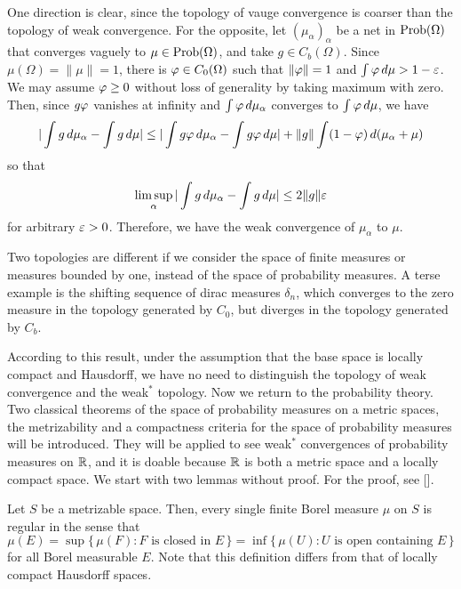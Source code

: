 \documentclass[10pt]{article}
\begin{document}
\begin{pf}
One direction is clear, since the topology of vauge convergence is coarser than the topology of weak convergence.
For the opposite, let $(\mu_\alpha)_\alpha$ be a net in $\operatorname{Prob}(\Omega)$ that converges vaguely to $\mu\in\operatorname{Prob}(\Omega)$, and take $g\in C_b(\Omega)$.
Since $\mu(\Omega)=\|\mu\|=1$, there is $\varphi\in C_0(\Omega)$ such that $\|\varphi\|=1$ and $\int\varphi\,d\mu>1-\varepsilon$.
We may assume $\varphi\ge0$ without loss of generality by taking maximum with zero.
Then, since $g\varphi$ vanishes at infinity and $\int\varphi\,d\mu_\alpha$ converges to $\int\varphi\,d\mu$, we have
\[|\int g\,d\mu_\alpha-\int g\,d\mu|\le|\int g\varphi\,d\mu_\alpha-\int g\varphi\,d\mu|+\|g\|\int(1-\varphi)\,d(\mu_\alpha+\mu)\]
so that
\[\limsup_\alpha|\int g\,d\mu_\alpha-\int g\,d\mu|\le2\|g\|\varepsilon\]
for arbitrary $\varepsilon>0$.
Therefore, we have the weak convergence of $\mu_\alpha$ to $\mu$.
\end{pf}
\begin{ex}
Two topologies are different if we consider the space of finite measures or measures bounded by one, instead of the space of probability measures.
A terse example is the shifting sequence of dirac measures $\delta_n$, which converges to the zero measure in the topology generated by $C_0$, but diverges in the topology generated by $C_b$.
\end{ex}

According to this result, under the assumption that the base space is locally compact and Hausdorff, we have no need to distinguish the topology of weak convergence and the weak$^*$ topology.
Now we return to the probability theory.
Two classical theorems of the space of probability measures on a metric spaces, the metrizability and a compactness criteria for the space of probability measures will be introduced.
They will be applied to see weak$^*$ convergences of probability measures on $\mathbb{R}$, and it is doable because $\mathbb{R}$ is both a metric space and a locally compact space.
We start with two lemmas without proof.
For the proof, see [].

\begin{lem}
Let $S$ be a metrizable space.
Then, every single finite Borel measure $\mu$ on $S$ is regular in the sense that
\[\mu(E)=\sup\{\,\mu(F):F\text{ is closed in }E\,\}
=\inf\{\,\mu(U):U\text{ is open containing }E\,\}\]
for all Borel measurable $E$.
Note that this definition differs from that of locally compact Hausdorff spaces.
\end{lem}
\end{document}
